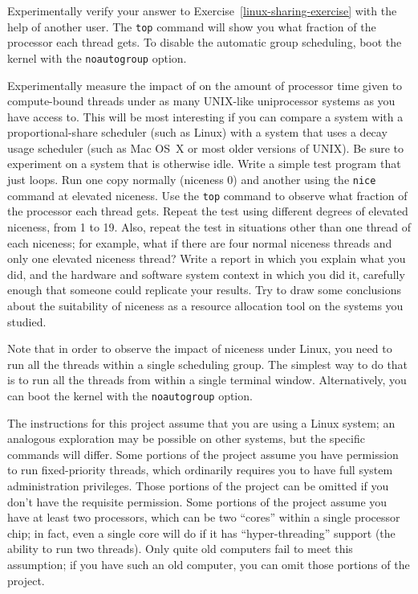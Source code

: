\begin{chapterEnumerate}
\item\label{linux-sharing-project}
Experimentally verify your answer to Exercise~\ref{linux-sharing-exercise} with the help of another user.  The
{\tt top} command will show you what fraction of the processor each
thread gets.  To disable the automatic group scheduling, boot the kernel with the \texttt{noautogroup} option.
\item
Experimentally measure the impact of  on the amount of
processor time given to compute-bound threads under as many UNIX-like
uniprocessor systems as you have access to.  This will be most
interesting if you can compare a system with a proportional-share
scheduler (such as Linux) with a system that uses a decay usage
scheduler (such as Mac OS~X or most older versions of UNIX).  Be sure
to experiment on a system that is otherwise idle.  Write a simple test
program that just loops.  Run one copy normally (niceness 0) and
another using the {\tt nice} command at elevated niceness.  Use the
{\tt top} command to observe what fraction of the processor each
thread gets.  Repeat the test using different degrees of elevated
niceness, from 1 to 19.  Also, repeat the test in situations other
than one thread of each niceness; for example, what if there are four
normal niceness threads and only one elevated niceness thread?
Write a report in which you explain what you did, and the hardware and
software system context in which you did it, carefully enough that
someone could replicate your results.  Try to draw some conclusions
about the suitability of niceness as a resource allocation tool on the
systems you studied.

Note that in order to observe the impact of niceness under Linux, you need
to run all the threads within a single scheduling group.  The simplest
way to do that is to run all the threads from within a single terminal
window.  Alternatively, you can boot the kernel with the \texttt{noautogroup} option.
\item\label{threads-FIFO-project}
The instructions for this project assume that you are using a Linux system; an
analogous exploration may be possible on other systems, but the specific commands
will differ.  Some portions of the project assume you have permission to run
fixed-priority threads, which ordinarily requires you to have full system administration
privileges.  Those portions of the project can be omitted if you don't have the requisite
permission.  Some portions of the project assume you have at least two processors, which can be
two ``cores'' within a single processor chip; in fact, even a single core will do if it has ``hyper-threading'' support (the ability to run two threads).  Only quite old computers fail to meet
this assumption; if you have such an old computer, you can omit those portions of the project.


\end{chapterEnumerate}
